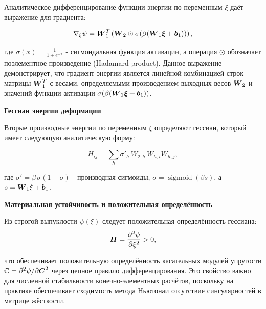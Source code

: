 Аналитическое дифференцирование функции энергии по переменным \(\xi\) даёт выражение для градиента:

\begin{equation}
 \nabla_\xi \psi = \boldsymbol{W}_1^T \left( \boldsymbol{W}_2 \odot \sigma(\beta (\boldsymbol{W}_1 \boldsymbol{\xi} + \boldsymbol{b}_1)) \right),
\label{eq:energy_gradient}
\end{equation}

где $\sigma(x) = \frac{1}{1 + e^{-x}}$ - сигмоидальная функция активации, 
а операция $\odot$ обозначает поэлементное произведение (Hadamard product). 
Данное выражение демонстрирует, что градиент энергии является линейной комбинацией строк матрицы $\boldsymbol{W}_1^T$ с весами, 
определяемыми произведением выходных весов $\boldsymbol{W}_2$ и значений функции активации $\sigma(\beta (\boldsymbol{W}_1 \boldsymbol{\xi} + \boldsymbol{b}_1))$.

\textbf{Гессиан энергии деформации}

Вторые производные энергии по переменным \(\xi\) определяют гессиан, который имеет следующую аналитическую форму:

\begin{equation}
 H_{ij} = \sum_h \sigma'_h\,W_{2,h}\,W_{h,i}W_{h,j},
\label{eq:energy_hessian}
\end{equation}

где $\sigma' = \beta\,\sigma(1-\sigma)$ - производная сигмоиды, 
$\sigma=\operatorname{sigmoid}(\beta s)$, а $s=\boldsymbol{W}_1\xi+\boldsymbol{b}_1$.

\textbf{Материальная устойчивость и положительная определённость}


Из строгой выпуклости \(\psi(\xi)\) следует положительная определённость гессиана:
\begin{equation}
 \boldsymbol{H} = \frac{\partial^2\psi}{\partial\xi^2} > 0,
\label{eq:positive_hessian}
\end{equation}

что обеспечивает положительную определённость касательных модулей упругости 
$\mathbb{C} = \partial^2\psi/\partial\boldsymbol{C}^2$ через цепное правило дифференцирования. 
Это свойство важно для численной стабильности конечно-элементных расчётов, 
поскольку на практике обеспечивает сходимость метода Ньютонаи отсутствие сингулярностей в матрице жёсткости.

